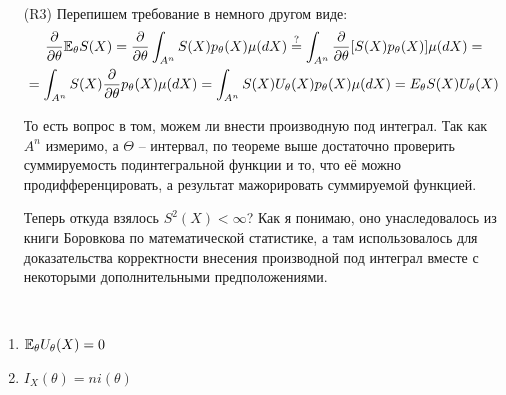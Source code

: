 \begin{note}~
    \begin{itemize}
        \item[(R3)] Перепишем требование в немного другом виде:
        \begin{multline*}
            \frac{\partial}{\partial \theta} \mathbb{E}_\theta S(X) = \frac{\partial}{\partial \theta} \int_{A^n} S(X) p_\theta(X) \mu(dX) \overset{?}{=} \int_{A^n} \frac{\partial}{\partial \theta} [S(X) p_\theta(X)] \mu(dX) =
            \\
            = \int_{A^n} S(X) \frac{\partial}{\partial \theta} p_\theta(X) \mu(dX) = \int_{A^n} S(X) U_\theta(X) p_\theta(X) \mu(dX) = E_\theta S(X) U_\theta(X)
        \end{multline*}

        То есть вопрос в том, можем ли внести производную под интеграл. Так как $A^n$ измеримо, а $\Theta$ -- интервал, по теореме выше достаточно проверить суммируемость подинтегральной функции и то, что её можно продифференцировать, а результат мажорировать суммируемой функцией.

        Теперь откуда взялось $S^2(X) < \infty$? Как я понимаю, оно унаследовалось из книги Боровкова по математической статистике, а там использовалось для доказательства корректности внесения производной под интеграл вместе с некоторыми дополнительными предположениями.
    \end{itemize}
\end{note}

\begin{proposition}~
    \begin{enumerate}
        \item $\mathbb{E}_\theta U_\theta(X) = 0$
        \item $I_X(\theta) = n i(\theta)$
    \end{enumerate}
\end{proposition}

